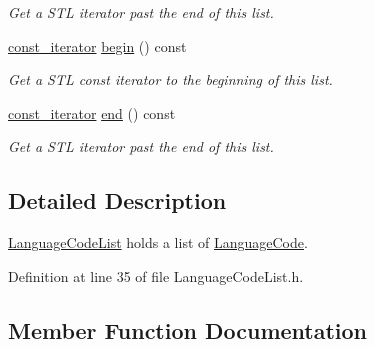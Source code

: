 \begin{DoxyCompactItemize}
\begin{DoxyCompactList}\small\item\em Get a S\+TL iterator past the end of this list. \end{DoxyCompactList}\item 
\hyperlink{class_mdt_1_1_translation_1_1_language_code_list_a33a8deeefde68723171be04829356ea5}{const\+\_\+iterator} \hyperlink{class_mdt_1_1_translation_1_1_language_code_list_aacffdd7f6cc1bb3a7ea451a10827808a}{begin} () const \hypertarget{class_mdt_1_1_translation_1_1_language_code_list_aacffdd7f6cc1bb3a7ea451a10827808a}{}\label{class_mdt_1_1_translation_1_1_language_code_list_aacffdd7f6cc1bb3a7ea451a10827808a}

\begin{DoxyCompactList}\small\item\em Get a S\+TL const iterator to the beginning of this list. \end{DoxyCompactList}\item 
\hyperlink{class_mdt_1_1_translation_1_1_language_code_list_a33a8deeefde68723171be04829356ea5}{const\+\_\+iterator} \hyperlink{class_mdt_1_1_translation_1_1_language_code_list_adcb8b0718d324e9325a995c7a2f50d59}{end} () const \hypertarget{class_mdt_1_1_translation_1_1_language_code_list_adcb8b0718d324e9325a995c7a2f50d59}{}\label{class_mdt_1_1_translation_1_1_language_code_list_adcb8b0718d324e9325a995c7a2f50d59}

\begin{DoxyCompactList}\small\item\em Get a S\+TL iterator past the end of this list. \end{DoxyCompactList}\end{DoxyCompactItemize}


\subsection{Detailed Description}
\hyperlink{class_mdt_1_1_translation_1_1_language_code_list}{Language\+Code\+List} holds a list of \hyperlink{class_mdt_1_1_translation_1_1_language_code}{Language\+Code}. 

Definition at line 35 of file Language\+Code\+List.\+h.



\subsection{Member Function Documentation}
